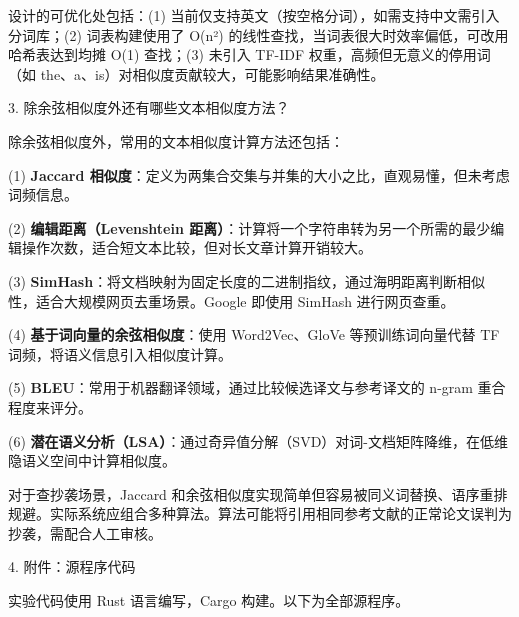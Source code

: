 \noindent\hspace*{2em}设计的可优化处包括：(1) 当前仅支持英文（按空格分词），如需支持中文需引入分词库；(2) 词表构建使用了 O(n²) 的线性查找，当词表很大时效率偏低，可改用哈希表达到均摊 O(1) 查找；(3) 未引入 TF-IDF 权重，高频但无意义的停用词（如 the、a、is）对相似度贡献较大，可能影响结果准确性。\par
\noindent\hspace*{2em}3. 除余弦相似度外还有哪些文本相似度方法？\par
\noindent\hspace*{2em}除余弦相似度外，常用的文本相似度计算方法还包括：\par
\noindent\hspace*{2em}(1) \textbf{Jaccard 相似度}：定义为两集合交集与并集的大小之比，直观易懂，但未考虑词频信息。\par
\noindent\hspace*{2em}(2) \textbf{编辑距离（Levenshtein 距离）}：计算将一个字符串转为另一个所需的最少编辑操作次数，适合短文本比较，但对长文章计算开销较大。\par
\noindent\hspace*{2em}(3) \textbf{SimHash}：将文档映射为固定长度的二进制指纹，通过海明距离判断相似性，适合大规模网页去重场景。Google 即使用 SimHash 进行网页查重。\par
\noindent\hspace*{2em}(4) \textbf{基于词向量的余弦相似度}：使用 Word2Vec、GloVe 等预训练词向量代替 TF 词频，将语义信息引入相似度计算。\par
\noindent\hspace*{2em}(5) \textbf{BLEU}：常用于机器翻译领域，通过比较候选译文与参考译文的 n-gram 重合程度来评分。\par
\noindent\hspace*{2em}(6) \textbf{潜在语义分析（LSA）}：通过奇异值分解（SVD）对词-文档矩阵降维，在低维隐语义空间中计算相似度。\par
\noindent\hspace*{2em}对于查抄袭场景，Jaccard 和余弦相似度实现简单但容易被同义词替换、语序重排规避。实际系统应组合多种算法。算法可能将引用相同参考文献的正常论文误判为抄袭，需配合人工审核。\par
\noindent\hspace*{2em}4. 附件：源程序代码\par
\noindent\hspace*{2em}实验代码使用 Rust 语言编写，Cargo 构建。以下为全部源程序。\par
